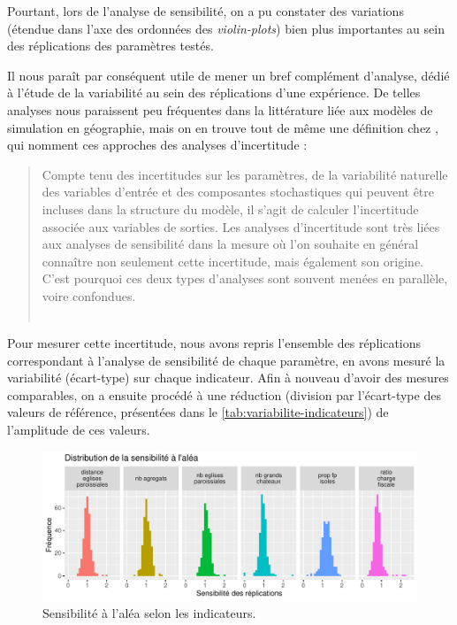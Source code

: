 Pourtant, lors de l'analyse de sensibilité, on a pu constater des variations (étendue dans l'axe des ordonnées des \textit{violin-plots}) bien plus importantes au sein des réplications des paramètres testés.

Il nous paraît par conséquent utile de mener un bref complément d'analyse, dédié à l'étude de la variabilité au sein des réplications d'une expérience.
De telles analyses nous paraissent peu fréquentes dans la littérature liée aux modèles de simulation en géographie, mais on en trouve tout de même une définition chez \textcite{ginot2005explorer}, qui nomment ces approches des \og analyses d'incertitude\fg{} : 
\begin{quotation}
	\og Compte tenu des incertitudes sur les paramètres, de la variabilité naturelle des variables d'entrée et des composantes stochastiques qui peuvent être incluses dans la structure du modèle, il s'agit de calculer l'incertitude associée aux variables de sorties.
	Les analyses d'incertitude sont très liées aux analyses de sensibilité dans la mesure où l'on souhaite en général connaître non seulement cette incertitude, mais également son origine.
	C'est pourquoi ces deux types d'analyses sont souvent menées en parallèle, voire confondues.\fg{}\\
	\mbox{}~ \hfill \cite[76]{ginot2005explorer}
\end{quotation}

Pour mesurer cette incertitude, nous avons repris l'ensemble des réplications correspondant à l'analyse de sensibilité de chaque paramètre, en avons mesuré la variabilité (écart-type) sur chaque indicateur.
Afin à nouveau d'avoir des mesures comparables, on a ensuite procédé à une réduction (division par l'écart-type des valeurs de référence, présentées dans le \cref{tab:variabilite-indicateurs}) de l'amplitude de ces valeurs.

\begin{figure}[H]
	\centering
	\includegraphics[width=\linewidth]{img/histo_sensibilite_alea.pdf}
	\caption{Sensibilité à l'aléa selon les indicateurs.}
	\label{fig:histo-sensib-alea}
\end{figure}

